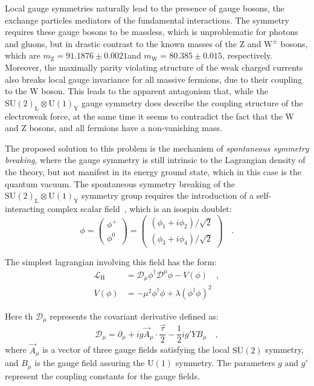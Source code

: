 Local gauge symmetries naturally lead to the presence of gauge bosons, the exchange particles mediators of the fundamental interactions. The symmetry requires these gauge bosons to be massless, which is unproblematic for photons and gluons, but in drastic contrast to the known masses of the Z and $\mathrm{W^\pm}$ bosons, which are $m_\mathrm{Z} = 91.1876 \pm 0.0021$\GeV and $m_\mathrm{W} = 80.385 \pm 0.015$\GeV, respectively. Moreover, the maximally parity violating structure of the weak charged currents also breaks local gauge invariance for all massive fermions, due to their coupling to the W boson. This leads to the apparent antagonism that, while the $\mathrm{SU(2)_L \otimes U(1)_Y}$ gauge symmetry does describe the coupling structure of the electroweak force, at the same time it seems to contradict the fact that the W and Z bosons, and all fermions have a non-vanishing mass. 

The proposed solution to this problem is the mechanism of \emph{spontaneous symmetry breaking}, where the gauge symmetry is still intrinsic to the Lagrangian density of the theory, but not manifest in its energy ground state, which in this case is the quantum vacuum. The spontaneous symmetry breaking of the $\mathrm{SU(2)_L \otimes U(1)_Y}$ symmetry group requires the introduction of a self-interacting complex scalar field~\cite{Wolf:2015kua}, which is an isospin doublet:
\begin{equation}
\phi = \begin{pmatrix} \phi^+       \\ \phi^0      \end{pmatrix} = \begin{pmatrix} (\phi_1+i\phi_2)/\sqrt{2}       \\ (\phi_3+i\phi_4)/\sqrt{2}      \end{pmatrix} \quad .
\end{equation}

\noindent The simplest lagrangian involving this field has the form:
\begin{equation}\label{eq:higgsL}
\begin{split}
\mathcal{L}_\mathrm{H} &= \mathcal{D}_\mu \phi^\dagger \mathcal{D}^\mu \phi - V(\phi) \quad,\\
V(\phi) &= -\mu^2\phi^\dagger\phi + \lambda(\phi^\dagger\phi)^2
\end{split}
\end{equation}

\noindent Here th $\mathcal{D}_\mu$ represents the covariant derivative defined as:
\begin{equation}
\mathcal{D}_\mu = \partial_\mu + i g \vec{A}_\mu \cdot \frac{\vec{\tau}}{2} - \frac{1}{2}i g' Y B_\mu \quad ,
\end{equation}
\noindent where $\vec{A}_\mu$ is a vector of three gauge fields satisfying the local $\mathrm{SU(2)}$ symmetry, and $B_\mu$ is the gauge field assuring the $\mathrm{U(1)}$ symmetry. The parameters $g$ and $g'$ represent the coupling constants for the gauge fields.

